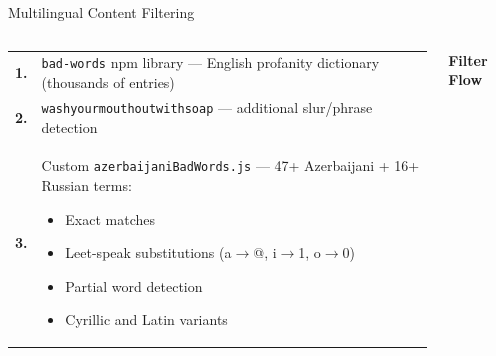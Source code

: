 \documentclass[aspectratio=169,12pt]{beamer}
\begin{document}
\begin{frame}{Multilingual Content Filtering}
\begin{columns}[t]
\begin{tcolorbox}[colback=SlideGray,colframe=BPGreen,arc=6pt,
  title={\faFilter\ \textbf{3-Layer Filtering Pipeline}},
  fonttitle=\bfseries\color{white},
  attach boxed title to top left={yshift=-2mm,xshift=4mm},
  boxed title style={colback=BPGreen}]
\small
\begin{tabular}{@{}p{}p{}@{}}
  \textbf{1.} & \texttt{bad-words} npm library --- English profanity dictionary (thousands of entries) \\[5pt]
  \textbf{2.} & \texttt{washyourmouthoutwithsoap} --- additional slur/phrase detection \\[5pt]
  \textbf{3.} & Custom \texttt{azerbaijaniBadWords.js} --- 47+ Azerbaijani + 16+ Russian terms:
    \begin{itemize}\setlength\itemsep{2pt}
      \item[\faCircleO] Exact matches
      \item[\faCircleO] Leet-speak substitutions (a$\to$@, i$\to$1, o$\to$0)
      \item[\faCircleO] Partial word detection
      \item[\faCircleO] Cyrillic and Latin variants
    \end{itemize}
\end{tabular}
\end{tcolorbox}

\small\bfseries Filter Flow


\end{columns}
\end{frame}
\end{document}
